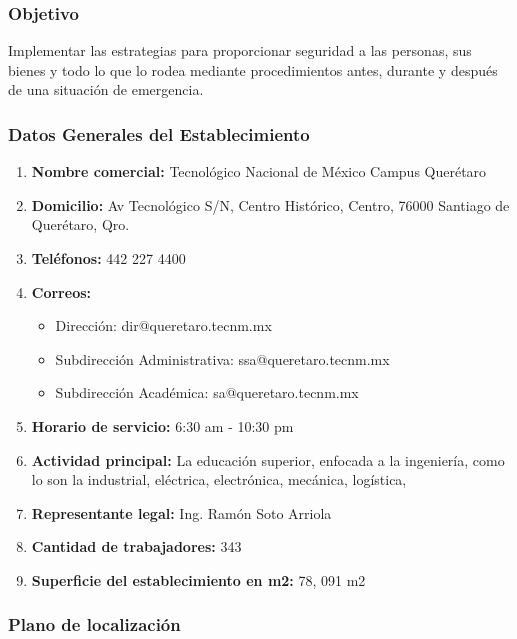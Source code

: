     
    \subsubsection{Objetivo}
    Implementar las estrategias para proporcionar seguridad a las personas, sus bienes y todo lo que
    lo rodea mediante procedimientos antes, durante y después de una situación de emergencia.
    
    \subsubsection{Datos Generales del Establecimiento}
    \begin{enumerate}
        \item \textbf{Nombre comercial:} Tecnológico Nacional de México Campus Querétaro
        \item \textbf{Domicilio:} Av Tecnológico S/N, Centro Histórico, Centro, 76000 Santiago de Querétaro, Qro.
        \item \textbf{Teléfonos:} 442 227 4400
        \item \textbf{Correos:}
     
     
     \begin{itemize}
     \item Dirección: dir@queretaro.tecnm.mx
     \item Subdirección Administrativa: ssa@queretaro.tecnm.mx
     \item Subdirección Académica: sa@queretaro.tecnm.mx
     \end{itemize}
    
     
        \item \textbf{Horario de servicio:} 6:30 am - 10:30 pm
        \item \textbf{Actividad principal:} La educación superior, enfocada a la ingeniería, como lo son la industrial, eléctrica, electrónica, mecánica, logística,
        \item \textbf{Representante legal:}
         Ing. Ramón Soto Arriola
        \item \textbf{Cantidad de trabajadores:} 343 
        
        \item \textbf{Superficie del establecimiento en m2:} 78, 091 m2
    \end{enumerate}
    
    \subsubsection{Plano de localización}
    
